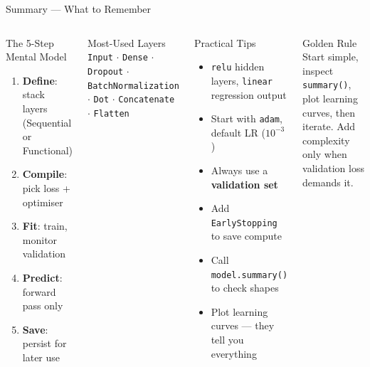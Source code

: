 \documentclass[aspectratio=169, 11pt]{beamer}
\begin{document}
%
%
\begin{frame}{Summary --- What to Remember}

\begin{columns}[T]
\begin{block}{\small The 5-Step Mental Model}
\footnotesize
\begin{enumerate}\setlength\itemsep{2pt}
  \item \textbf{Define}: stack layers (Sequential or Functional)
  \item \textbf{Compile}: pick loss + optimiser
  \item \textbf{Fit}: train, monitor validation
  \item \textbf{Predict}: forward pass only
  \item \textbf{Save}: persist for later use
\end{enumerate}
\end{block}

\vspace{0.15cm}

\begin{block}{\small Most-Used Layers}
\footnotesize
\texttt{Input} $\cdot$ \texttt{Dense} $\cdot$ \texttt{Dropout} $\cdot$ \texttt{BatchNormalization} $\cdot$ \texttt{Dot} $\cdot$ \texttt{Concatenate} $\cdot$ \texttt{Flatten}
\end{block}

\begin{block}{\small Practical Tips}
\footnotesize
\begin{itemize}\setlength\itemsep{2pt}
  \item \texttt{relu} hidden layers, \texttt{linear} regression output
  \item Start with \texttt{adam}, default LR ($10^{-3}$)
  \item Always use a \textbf{validation set}
  \item Add \texttt{EarlyStopping} to save compute
  \item Call \texttt{model.summary()} to check shapes
  \item Plot learning curves --- they tell you everything
\end{itemize}
\end{block}

\vspace{0.15cm}

\begin{exampleblock}{\small Golden Rule}
\footnotesize
Start simple, inspect \texttt{summary()}, plot learning curves, then iterate. Add complexity only when validation loss demands it.
\end{exampleblock}
\end{columns}

\end{frame}
%
\end{document}
